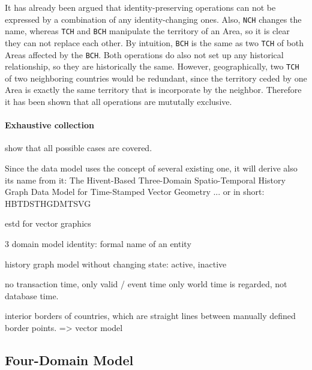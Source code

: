 It has already been argued that identity-preserving operations can not be expressed by a combination of any identity-changing ones. Also, \texttt{NCH} changes the name, whereas \texttt{TCH} and \texttt{BCH} manipulate the territory of an Area, so it is clear they can not replace each other. By intuition, \texttt{BCH} is the same as two \texttt{TCH} of both Areas affected by the \texttt{BCH}. Both operations do also not set up any historical relationship, so they are historically the same. However, geographically, two \texttt{TCH} of two neighboring countries would be redundant, since the territory ceded by one Area is exactly the same territory that is incorporate by the neighbor. Therefore it has been shown that all operations are mututally exclusive.


\paragraph{Exhaustive collection} %
\label{par:exhaustive_collection}

show that all possible cases are covered.




\newpage
Since the data model uses the concept of several existing one, it will derive also its name from it: The Hivent-Based Three-Domain Spatio-Temporal History Graph Data Model for Time-Stamped Vector Geometry
... or in short: HBTDSTHGDMTSVG

estd for vector graphics

3 domain model
identity: formal name of an entity

history graph model without changing state: active, inactive

no transaction time, only valid / event time
only world time is regarded, not database time.

interior borders of countries, which are straight lines between manually defined border points.
=> vector model



\subsection{Four-Domain Model} %
\label{sub:four_domain_model}

